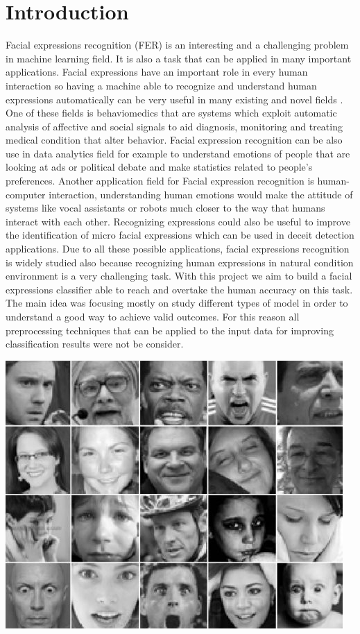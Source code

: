 \documentclass[10pt,twocolumn,letterpaper]{article}
\begin{document}
\section{Introduction}
   Facial expressions recognition (FER) is an interesting and a challenging problem 
   in machine learning field. It is also a task that can be applied in many important applications.
   Facial expressions have an important role in every human interaction so having a machine able to 
   recognize and understand human expressions automatically can be very useful
   in many existing and novel fields \cite{2}.
   \\One of these fields is behaviomedics that are systems which exploit automatic analysis of affective and social signals 
   to aid diagnosis, monitoring and treating medical condition that alter behavior.
   Facial expression recognition can be also use in data analytics field for example to understand 
   emotions of people that are looking at ads or political debate and make statistics related to people's preferences. 
   Another application field for Facial expression recognition is human-computer interaction, understanding human emotions 
   would make the attitude of systems like vocal assistants or robots much closer to the way that humans interact with each other.
   Recognizing expressions could also be useful to improve the identification of micro facial expressions which can be used in 
   deceit detection applications.
   Due to all these possible applications, facial expressions recognition is widely studied also because recognizing 
   human expressions in natural condition environment is a very challenging task.
   With this project we aim to build a facial expressions classifier able to reach and overtake the human accuracy on this task. 
   The main idea was focusing mostly on study different types of model in order to understand a good way to achieve valid outcomes.
   For this reason all preprocessing techniques that can be applied to the input data for improving classification results were not be consider.
   \begin{center}
      \includegraphics[width=0.8\linewidth]{./immagini/dataset.jpeg}
   \end{center}
\end{document}
